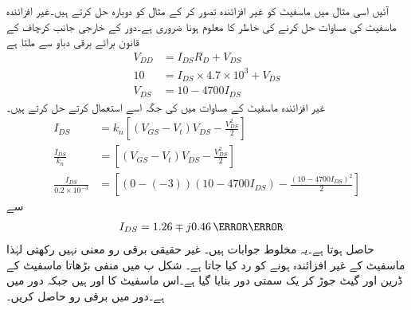 آئیں اسی مثال میں ماسفیٹ کو غیر افزائندہ تصور کر کے مثال کو دوبارہ حل کرتے ہیں۔غیر افزائندہ ماسفیٹ کی مساوات حل کرنے کی خاطر   کا معلوم ہونا ضروری ہے۔دور کے خارجی جانب کرچاف کے قانون برائے برقی دباو سے ملتا ہے
\begin{align*}
V_{DD}&=I_{DS} R_D+V_{DS}\\
10&=I_{DS} \times 4.7 \times 10^{3}+V_{DS}\\
V_{DS}&=10-4700 I_{DS}
\end{align*}
غیر افزائندہ ماسفیٹ کے مساوات میں  کی جگہ اسے استعمال کرتے حل کرتے ہیں۔
\begin{align*}
I_{DS}&=k_n \left[\left(V_{GS}-V_t \right )V_{DS} -\frac{V_{DS}^{2}}{2}\right ]\\
\frac{I_{DS}}{k_n}&=\left[\left(V_{GS}-V_t \right )V_{DS} -\frac{V_{DS}^{2}}{2}\right ]\\
\frac{I_{DS}}{0.2 \times 10^{-3}}&=\left[\left(0-(-3) \right ) \left(10-4700 I_{DS} \right )- \frac{\left( 10-4700 I_{DS} \right )^{2}}{2}\right]
\end{align*}
سے
\begin{align*}
I_{DS}&=1.26\mp j 0.46 \,{\milli \ampere}
\end{align*}
حاصل ہوتا ہے۔یہ مخلوط جوابات ہیں۔ غیر حقیقی برقی رو معنی نہیں رکھتی لہٰذا ماسفیٹ کے غیر افزائندہ ہونے کو رد کیا جاتا ہے۔
 
شکل  پ میں منفی بڑھاتا ماسفیٹ کے ڈرین اور گیٹ جوڑ کر یک سمتی دور بنایا گیا ہے۔اس ماسفیٹ کا  اور  ہیں  جبکہ دور میں   ہے۔دور میں برقی رو حاصل کریں۔

